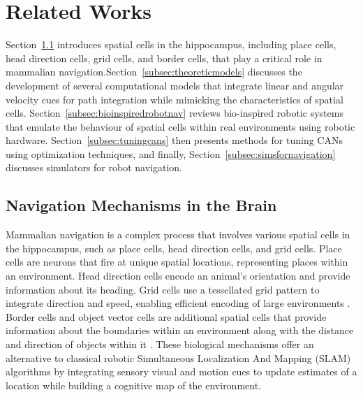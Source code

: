 
\section{Related Works}
\label{sec:relatedworks}

%
Section~\ref{subsec:navigationmechanisms} introduces spatial cells in the hippocampus, including place cells, head direction cells, grid cells, and border cells, that play a critical role in mammalian navigation.Section~\ref{subsec:theoreticmodels} discusses the development of several computational models that integrate linear and angular velocity cues for path integration while mimicking the characteristics of spatial cells. Section~\ref{subsec:bioinspiredrobotnav} reviews bio-inspired robotic systems that emulate the behaviour of spatial cells within real environments using robotic hardware. Section~\ref{subsec:tuningcans} then presents methods for tuning CANs using optimization techniques, and finally, Section~\ref{subsec:simsfornavigation} discusses simulators for robot navigation.

\subsection{Navigation Mechanisms in the Brain}
\label{subsec:navigationmechanisms}
Mammalian navigation is a complex process that involves various spatial cells in the hippocampus, such as place cells, head direction cells, and grid cells. Place cells \cite{o1976place} are neurons that fire at unique spatial locations, representing places within an environment. Head direction cells \cite{taube1998head} encode an animal's orientation and provide information about its heading. Grid cells \cite{hafting2005microstructure,moser2014grid,banino2018vector} use a tessellated grid pattern to integrate direction and speed, enabling efficient encoding of large environments \cite{grieves2017representation}. Border cells and object vector cells are additional spatial cells that provide information about the boundaries within an environment along with the distance and direction of objects within it \cite{hoydal2019object, bordercell}. These biological mechanisms offer an alternative to classical robotic Simultaneous Localization And Mapping (SLAM) algorithms by integrating sensory visual and motion cues to update estimates of a location while building a cognitive map of the environment. 


